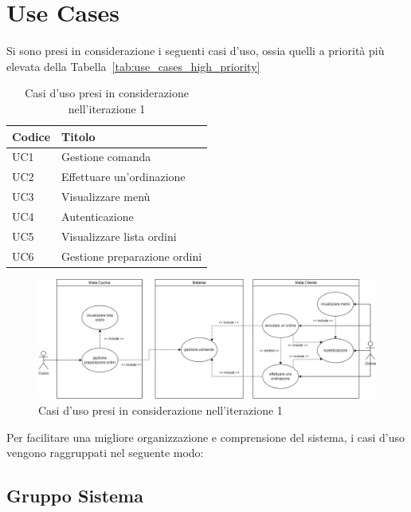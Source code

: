 \section{Use Cases}

Si sono presi in considerazione i seguenti casi d'uso, ossia quelli a priorità più elevata della Tabella~\ref{tab:use_cases_high_priority}

\begin{table}[htbp]
	\centering
	\begin{tabularx}{\textwidth}{|>{\centering\arraybackslash} m{4em}| >{\raggedright\arraybackslash}X |}
		\hline
		\textbf{Codice} & \textbf{Titolo} \\ [0.5ex]
		\hline\hline
		UC1 & Gestione comanda  \\
		\hline
		UC2 & Effettuare un'ordinazione \\
		\hline
		UC3 & Visualizzare menù \\
		\hline
		UC4 & Autenticazione \\
		\hline
		UC5 & Visualizzare lista ordini \\
		\hline
		UC6 & Gestione preparazione ordini \\
		\hline
	\end{tabularx}
	\caption{Casi d'uso presi in considerazione nell'iterazione 1}
	\label{tab:use_cases_it1}
\end{table}

\begin{figure}[htbp]
	\centering
	\includegraphics[scale=0.36]{iterazione1/images/useCases_it1.jpg}
	\caption{Casi d'uso presi in considerazione nell'iterazione 1\label{fig:use_cases_it1}}
\end{figure}

Per facilitare una migliore organizzazione e comprensione del sistema, i casi d'uso vengono raggruppati nel seguente modo:

\subsection{Gruppo Sistema}
